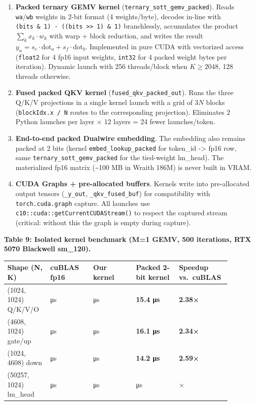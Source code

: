 \begin{enumerate}
\def\labelenumi{\arabic{enumi}.}
\item
  \textbf{Packed ternary GEMV kernel}
  (\texttt{ternary\_sott\_gemv\_packed}). Reads \texttt{wa}/\texttt{wb}
  weights in 2-bit format (4 weights/byte), decodes in-line with
  \texttt{(bits\ \&\ 1)\ -\ ((bits\ \textgreater{}\textgreater{}\ 1)\ \&\ 1)}
  branchlessly, accumulates the product \(\sum_k x_k \cdot w_k\) with
  warp + block reduction, and writes the result
  \(y_n = s_c \cdot \text{dot}_a + s_f \cdot \text{dot}_b\). Implemented
  in pure CUDA with vectorized access (\texttt{float2} for 4 fp16 input
  weights, \texttt{int32} for 4 packed weight bytes per iteration).
  Dynamic launch with 256 threads/block when \(K \geq 2048\), 128
  threads otherwise.
\item
  \textbf{Fused packed QKV kernel} (\texttt{fused\_qkv\_packed\_out}).
  Runs the three Q/K/V projections in a single kernel launch with a grid
  of \(3N\) blocks (\texttt{blockIdx.x\ /\ N} routes to the
  corresponding projection). Eliminates 2 Python launches per layer × 12
  layers = 24 fewer launches/token.
\item
  \textbf{End-to-end packed Dualwire embedding}. The embedding also
  remains packed at 2 bits (kernel \texttt{embed\_lookup\_packed} for
  token\_id -> fp16 row, same \texttt{ternary\_sott\_gemv\_packed} for
  the tied-weight lm\_head). The materialized fp16 matrix
  (\textasciitilde100 MB in Wraith 186M) is never built in VRAM.
\item
  \textbf{CUDA Graphs + pre-allocated buffers}. Kernels write into
  pre-allocated output tensors (\texttt{\_y\_out},
  \texttt{\_qkv\_fused\_buf}) for compatibility with
  \texttt{torch.cuda.graph} capture. All launches use
  \texttt{c10::cuda::getCurrentCUDAStream()} to respect the captured
  stream (critical: without this the graph is empty during capture).
\end{enumerate}

\textbf{Table 9: Isolated kernel benchmark (M=1 GEMV, 500 iterations,
RTX 5070 Blackwell sm\_120).}

{\def\LTcaptype{none} %
{\footnotesize\setlength{\tabcolsep}{3pt}
\begin{longtable}[]{@{}>{\raggedright\arraybackslash}p{0.180\linewidth}>{\raggedright\arraybackslash}p{0.180\linewidth}>{\raggedright\arraybackslash}p{0.180\linewidth}>{\raggedright\arraybackslash}p{0.180\linewidth}>{\raggedright\arraybackslash}p{0.180\linewidth}@{}}
\toprule\noalign{}
Shape (N, K) & cuBLAS fp16 & Our kernel & Packed 2-bit kernel & Speedup vs.~cuBLAS \\
\midrule\noalign{}
\endhead
\bottomrule\noalign{}
\endlastfoot
(1024, 1024) Q/K/V/O & 36.6 μs & 17.7 μs & \textbf{15.4 μs} &
\textbf{2.38×} \\
(4608, 1024) gate/up & 37.7 μs & 16.6 μs & \textbf{16.1 μs} &
\textbf{2.34×} \\
(1024, 4608) down & 36.7 μs & 20.0 μs & \textbf{14.2 μs} &
\textbf{2.59×} \\
(50257, 1024) lm\_head & 185.4 μs & 199 μs & 199 μs & 0.93× \\
\end{longtable}
}
}


